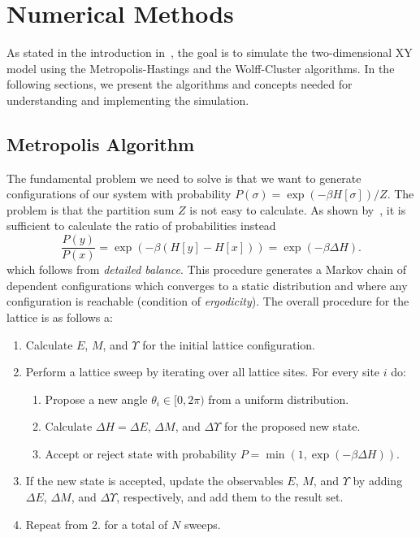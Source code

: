 \section{Numerical Methods}\label{sec:theo:numerical_methods}
	As stated in the introduction in~, the goal is to simulate the two-dimensional XY model using the Metropolis-Hastings and the Wolff-Cluster algorithms. In the following sections, we present the algorithms and concepts needed for understanding and implementing the simulation.

	\subsection{Metropolis Algorithm}\label{sec:theo:metropolis}
		The fundamental problem we need to solve is that we want to generate configurations of our system with probability $P(\sigma) = \exp{(-\beta H[\sigma])}/Z$. The problem is that the partition sum $Z$ is not easy to calculate. As shown by~\citet{metropolis}, it is sufficient to calculate the ratio of probabilities instead
		\begin{equation}
			\frac{P(y)}{P(x)} = \exp{(-\beta(H[y] - H[x]))} = \exp{(-\beta \Delta H)}.
		\end{equation}
		which follows from \emph{detailed balance}. This procedure generates a Markov chain of dependent configurations which converges to a static distribution and where any configuration is reachable (condition of \emph{ergodicity}). The overall procedure for the lattice is as follows a:
		\begin{enumerate}
			\item Calculate $E$, $M$, and $\Upsilon$ for the initial lattice configuration.
			\item Perform a lattice sweep by iterating over all lattice sites. For every site $i$ do:
			\begin{enumerate}
				\item Propose a new angle $\theta_i \in [0,2\pi)$ from a uniform distribution.
				\item Calculate $\Delta H = \Delta E$, $\Delta M$, and $\Delta \Upsilon$ for the proposed new state.
				\item Accept or reject state with probability $P = \min{(1, \exp{(-\beta\Delta H)})}$.
			\end{enumerate}
			\item If the new state is accepted, update the observables $E$, $M$, and $\Upsilon$ by adding $\Delta E$, $\Delta M$, and $\Delta \Upsilon$, respectively, and add them to the result set.
			\item Repeat from 2. for a total of $N$ sweeps.
		\end{enumerate}
		
